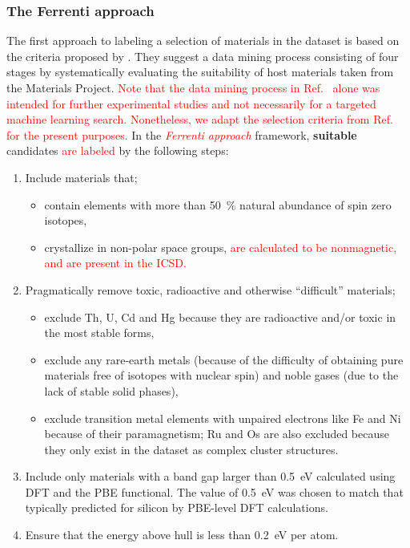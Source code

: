 \documentclass[superscriptaddress,unsortedaddress,
 amsmath,amssymb,
 aps,
]{revtex4-2}
\newcommand{\mrk}[1]{\textcolor{red}{#1}}
\begin{document}
\subsubsection*{The Ferrenti approach}
The first approach to labeling a selection of materials in the dataset is based on the criteria proposed by \citeauthor{Ferrenti2020} \cite{Ferrenti2020}. 
They suggest a data mining process consisting of four stages by systematically evaluating the suitability of host materials taken from the Materials Project. 
\mrk{Note that the data mining process in Ref.~\cite{Ferrenti2020} alone was intended for further experimental studies and not necessarily for a targeted machine learning search. Nonetheless, we adapt the selection criteria from Ref.~\cite{Ferrenti2020} for the present purposes.} 
In the \mrk{\emph{Ferrenti approach}} framework, \textbf{suitable} candidates \mrk{are labeled} by the following steps: 
\begin{enumerate}
    \item Include materials that;
    \begin{itemize}
        \item contain elements with more than \SI{50}{\percent} natural abundance of spin zero isotopes,
        \item crystallize in non-polar space groups, \mrk{are calculated to be nonmagnetic, and 
        are present in the ICSD.}
    \end{itemize}
    \item Pragmatically remove toxic, radioactive and otherwise ``difficult'' materials;
    \begin{itemize}
        \item exclude Th, U, Cd and Hg because they are radioactive and/or toxic in the most stable forms,
        \item exclude any rare-earth metals (because of the difficulty of obtaining pure materials free of isotopes with nuclear spin) and noble gases (due to the lack of stable solid phases),
        \item exclude transition metal elements with unpaired electrons like Fe and Ni because of their paramagnetism; Ru and Os are also excluded because they only exist in the dataset as complex cluster structures. 
    \end{itemize}
    \item Include only materials with a band gap larger than \SI{0.5}{\electronvolt} calculated using DFT and the PBE functional.
    The value of \SI{0.5}{\electronvolt} was chosen to match that typically predicted for silicon by PBE-level DFT calculations. 
    \item Ensure that the energy above hull is less than \SI{0.2}{\electronvolt} per atom.
\end{enumerate}
\end{document}
